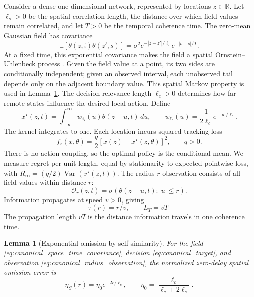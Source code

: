 \documentclass[11pt]{article}
\newtheorem{lemma}{Lemma}
\begin{document}
Consider a dense one-dimensional network, represented by locations
$z\in\mathbb R$. Let $\ell_s>0$ be the spatial correlation length, the
distance over which field values remain correlated, and let $T>0$ be the
temporal coherence time. The zero-mean Gaussian field has covariance
\begin{equation}
\mathbb E[\theta(z,t)\theta(z',s)]
=\sigma^2e^{-|z-z'|/\ell_s}e^{-|t-s|/T}.
\label{eq:canonical_space_time_covariance}
\end{equation}
At a fixed time, this exponential covariance makes the field a spatial
Ornstein--Uhlenbeck process \cite{williams2006gaussian}. Given the field
value at a point, its two sides are conditionally independent; given an
observed interval, each unobserved tail depends only on the adjacent boundary
value. This spatial Markov property is used in Lemma~\ref{prop:canonical_eta_S}.
The decision-relevance length $\ell_c>0$ determines how far remote states
influence the desired local action. Define
\begin{equation}
x^\star(z,t)=\int_{-\infty}^{\infty}w_{\ell_c}(u)\theta(z+u,t)\,du,
\qquad w_{\ell_c}(u)=\frac{1}{2\ell_c}e^{-|u|/\ell_c}.
\label{eq:canonical_target}
\end{equation}
The kernel integrates to one. Each location incurs squared tracking loss
\begin{equation}
f_z(x,\theta)=\frac q2[x(z)-x^\star(z,\theta)]^2,\qquad q>0.
\label{eq:canonical_tracking_cost}
\end{equation}
There is no action coupling, so the optimal policy is the conditional mean.
We measure regret per unit length, equal by stationarity to expected
pointwise loss, with $R_\infty=(q/2)\operatorname{Var}(x^\star(z,t))$.
The radius-$r$ observation consists of all field values within distance $r$:
\begin{equation}
\mathcal O_r(z,t)=\sigma(\theta(z+u,t):|u|\le r).
\label{eq:canonical_radius_observation}
\end{equation}
Information propagates at speed $v>0$, giving
\begin{equation}
\tau(r)=r/v,\qquad L_T=vT.
\label{eq:temporal_propagation_length}
\end{equation}
The propagation length $vT$ is the distance information travels in one
coherence time.

\begin{lemma}[Exponential omission by self-similarity]
\label{prop:canonical_eta_S}
For the field \eqref{eq:canonical_space_time_covariance}, decision
\eqref{eq:canonical_target}, and observation
\eqref{eq:canonical_radius_observation}, the normalized zero-delay spatial
omission error is
\begin{equation}
\eta_S(r)=\eta_0e^{-2r/\ell_c},\qquad
\eta_0=\frac{\ell_c}{\ell_c+2\ell_s}.
\label{eq:canonical_eta_S}
\end{equation}
\end{lemma}
\end{document}
